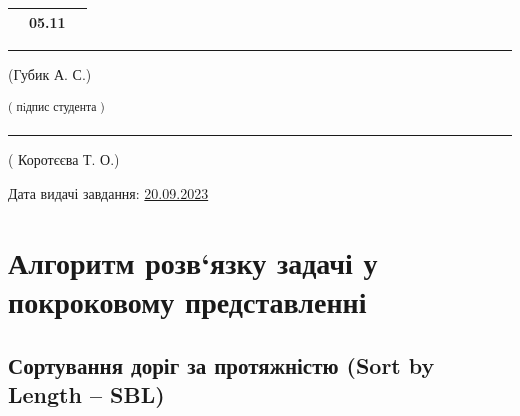 \documentclass[14pt]{extarticle}
\begin{document}
\begin{enumerate}
\begin{center}
\begin{tabular}{| c | p{13cm} | c | }
\begin{itemize}
\end{itemize}
&
05.11\\
        \hline




        
    \end{tabular}
    
\end{center}
\end{enumerate}

\rule{3cm Завдання прийнято до виконання:\space}{0.3pt} 
(Губик А. С.)

\hspace{7.4cm} \textsuperscript{( пiдпис студента )}

\rule{3cm Керівник роботи:\space}{0.3pt} 
( Коротєєва Т. О.)

Дата видачі завдання: \underline{20.09.2023}

\break
\section{Алгоритм розв‘язку задачі у покроковому представленні}

\subsection{Сортування доріг за протяжністю (Sort by Length -- SBL)}

\end{document}
